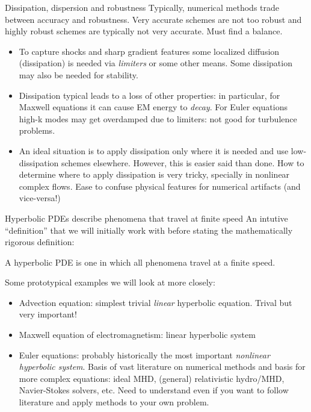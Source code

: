 \documentclass[aspectratio=169]{beamer}
\newcommand{\mypause}{}
\begin{document}
\begin{frame}{Dissipation, dispersion and robustness}
  Typically, numerical methods trade between accuracy and
  robustness. Very accurate schemes are not too robust and highly
  robust schemes are typically not very accurate. Must find a balance.
  \mypause%
  \begin{itemize}
  \item To capture shocks and sharp gradient features some localized
    diffusion (dissipation) is needed via \emph{limiters} or some
    other means. Some dissipation may also be needed for stability.
  \item Dissipation typical leads to a loss of other properties: in
    particular, for Maxwell equations it can cause EM energy to
    \emph{decay}. For Euler equations high-k modes may get overdamped
    due to limiters: not good for turbulence problems.%
    \mypause%
  \item An ideal situation is to apply dissipation only where it is
    needed and use low-dissipation schemes elsewhere. However, this is
    easier said than done. How to determine where to apply dissipation
    is very tricky, specially in nonlinear complex flows. Ease to
    confuse physical features for numerical artifacts (and
    vice-versa!)
  \end{itemize}
\end{frame}

\begin{frame}{Hyperbolic PDEs describe phenomena that travel at finite
    speed}
  \footnotesize%
  An intutive ``definition'' that we will initially work with before
  stating the mathematically rigorous definition:
  \begin{definition}
    A hyperbolic PDE is one in which all phenomena travel at a finite
    speed.
  \end{definition}

  \mypause%
  \vskip0.1in%
  Some prototypical examples we will look at more closely:
  \begin{itemize}
  \item Advection equation: simplest trivial \emph{linear} hyperbolic
    equation. Trival but very important!
  \item Maxwell equation of electromagnetism: linear hyperbolic system
  \item Euler equations: probably historically the most important
    \emph{nonlinear hyperbolic system}. Basis of vast literature on
    numerical methods and basis for more complex equations: ideal MHD,
    (general) relativistic hydro/MHD, Navier-Stokes solvers, etc. Need
    to understand even if you want to follow literature and apply
    methods to your own problem.
  \end{itemize}
  
\end{frame}
\end{document}
